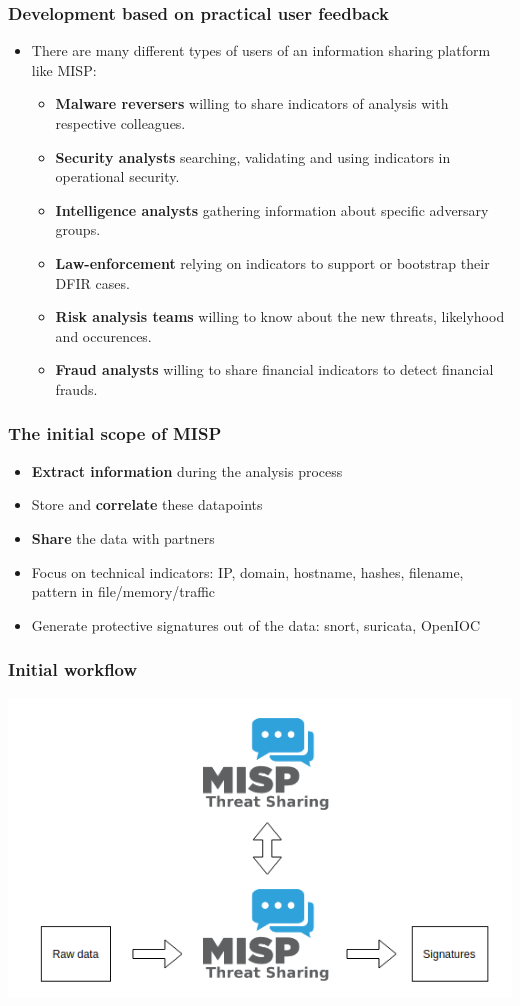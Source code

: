 \begin{frame}
  \frametitle{Development based on practical user feedback}
  \begin{itemize}
    \item There are many different types of users of an information sharing platform like MISP:
    \begin{itemize}
      \item {\bf Malware reversers} willing to share indicators of analysis with respective colleagues.
      \item {\bf Security analysts} searching, validating and using indicators in operational security.
      \item {\bf Intelligence analysts} gathering information about specific adversary groups.
      \item {\bf Law-enforcement} relying on indicators to support or bootstrap their DFIR cases.
      \item {\bf Risk analysis teams} willing to know about the new threats, likelyhood and occurences.
      \item {\bf Fraud analysts} willing to share financial indicators to detect financial frauds.
    \end{itemize}
  \end{itemize}
\end{frame}

\begin{frame}
  \frametitle{The initial scope of MISP}
  \begin{itemize}
    \item {\bf Extract information} during the analysis process
    \item Store and {\bf correlate} these datapoints
    \item {\bf Share} the data with partners
    \item Focus on technical indicators: IP, domain, hostname, hashes, filename, pattern in file/memory/traffic
    \item Generate protective signatures out of the data: snort, suricata, OpenIOC
  \end{itemize}
\end{frame}

\begin{frame}
  \frametitle{Initial workflow}
  \begin{center}
    \includegraphics[width=1.0\linewidth]{workflow_initial2.png}
  \end{center}
\end{frame}

